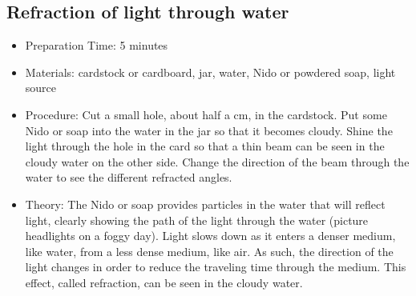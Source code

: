 \subsection{Refraction of light through water}
\begin{itemize}
\item{Preparation Time: 5 minutes}
\item{Materials: cardstock or cardboard, jar, water, Nido or powdered soap, light source}
\item{Procedure: Cut a small hole, about half a cm, in the cardstock. Put some Nido or soap into the water in the jar so that it becomes cloudy. Shine the light through the hole in the card so that a thin beam can be seen in the cloudy water on the other side. Change the direction of the beam through the water to see the different refracted angles.}
\item{Theory: The Nido or soap provides particles in the water that will reflect light, clearly showing the path of the light through the water (picture headlights on a foggy day). Light slows down as it enters a denser medium, like water, from a less dense medium, like air. As such, the direction of the light changes in order to reduce the traveling time through the medium. This effect, called refraction, can be seen in the cloudy water.}
\end{itemize}

